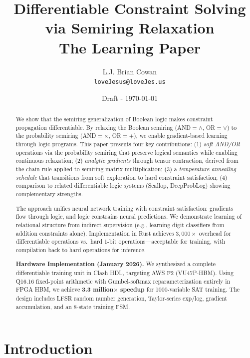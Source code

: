 \documentclass[11pt,a4paper]{article}
\title{Differentiable Constraint Solving via Semiring Relaxation\\
\large The Learning Paper}
\author{
  L.J. Brian Cowan \\
  \texttt{loveJesus@loveJes.us}
}
\date{Draft - \today}
\begin{document}
\maketitle

\begin{abstract}
We show that the semiring generalization of Boolean logic makes constraint propagation differentiable.
By relaxing the Boolean semiring (AND$=\land$, OR$=\lor$) to the probability semiring (AND$=\times$, OR$=+$), we enable gradient-based learning through logic programs.
This paper presents four key contributions:
(1) \emph{soft AND/OR} operations via the probability semiring that preserve logical semantics while enabling continuous relaxation;
(2) \emph{analytic gradients} through tensor contraction, derived from the chain rule applied to semiring matrix multiplication;
(3) a \emph{temperature annealing schedule} that transitions from soft exploration to hard constraint satisfaction;
(4) comparison to related differentiable logic systems (Scallop, DeepProbLog) showing complementary strengths.

The approach unifies neural network training with constraint satisfaction: gradients flow through logic, and logic constrains neural predictions.
We demonstrate learning of relational structure from indirect supervision (e.g., learning digit classifiers from addition constraints alone).
Implementation in Rust achieves $3{,}000\times$ overhead for differentiable operations vs.\ hard 1-bit operations---acceptable for training, with compilation back to hard operations for inference.

\textbf{Hardware Implementation (January 2026).}
We synthesized a complete differentiable training unit in Clash HDL, targeting
AWS F2 (VU47P-HBM). Using Q16.16 fixed-point arithmetic with Gumbel-softmax
reparameterization entirely in FPGA HBM, we achieve \textbf{3.3 million$\times$
speedup} for 1000-variable SAT training. The design includes LFSR random number
generation, Taylor-series exp/log, gradient accumulation, and an 8-state training FSM.
\end{abstract}

\section{Introduction}
\label{sec:intro_chirho}

\scopeclarification
\end{document}
